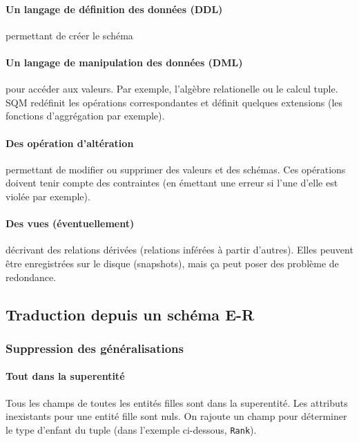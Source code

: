 \documentclass[a4paper]{article}
\begin{document}
\paragraph{Un langage de définition des données (DDL)} permettant de créer le schéma
\paragraph{Un langage de manipulation des données (DML)} pour accéder aux valeurs.
Par exemple, l'algèbre relationelle ou le calcul tuple. SQM redéfinit les opérations
correspondantes et définit quelques extensions (les fonctions d'aggrégation par exemple).
\paragraph{Des opération d'altération} permettant de modifier ou supprimer des valeurs et des schémas.
Ces opérations doivent tenir compte des contraintes (en émettant une erreur si l'une d'elle est violée par exemple).
\paragraph{Des vues (éventuellement)} décrivant des relations dérivées
(relations inférées à partir d'autres). Elles peuvent être enregistrées sur le
disque (snapshots), mais ça peut poser des problème de redondance.

\subsection{Traduction depuis un schéma E-R}
\subsubsection{Suppression des généralisations}
\paragraph{Tout dans la superentité}
Tous les champs de toutes les entités filles sont dans la superentité. Les attributs
inexistants pour une entité fille sont nuls. On rajoute un champ pour déterminer
le type d'enfant du tuple (dans l'exemple ci-dessous, \texttt{Rank}).\\
\end{document}

